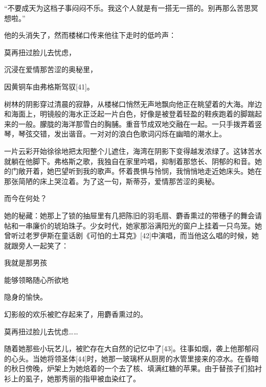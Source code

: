 \documentclass{article}
\begin{document}
“不要成天为这档子事闷闷不乐。我这个人就是有一搭无一搭的。别再那么苦思冥想啦。”



他的头消失了，然而楼梯口传来他往下走时的低吟声：



莫再扭过脸儿去忧虑，



沉浸在爱情那苦涩的奥秘里，



因黄铜车由弗格斯驾驭[41]。



树林的阴影穿过清晨的寂静，从楼梯口悄然无声地飘向他正在眺望着的大海。岸边和海面上，明镜般的海水正泛起一片白色，好像是被登着轻盈的鞋疾跑着的脚踹起来的一般。朦胧的海洋那雪白的胸脯。重音节成双地交融在一起。一只手拨弄着竖琴，琴弦交错，发出谐音。一对对的浪白色歌词闪烁在幽暗的潮水上。



一片云彩开始徐徐地把太阳整个儿遮住，海湾在阴影下变得越发浓绿了。这钵苦水就躺在他脚下。弗格斯之歌，我独自在家里吟唱，抑制着那悠长、阴郁的和音。她的门敞开着，她巴望听到我的歌声。怀着畏惧与怜悯，我悄悄地走近她床头。她在那张简陋的床上哭泣着。为了这一句，斯蒂芬，爱情那苦涩的奥秘。



而今在何处？



她的秘藏：她那上了锁的抽屉里有几把陈旧的羽毛扇、麝香熏过的带穗子的舞会请帖和一串廉价的琥珀珠子。少女时代，她家那浴满阳光的窗户上挂着一只鸟笼。她曾听过老罗伊斯在童话剧《可怕的土耳克》[42]中演唱，而当他这么唱的时候，她就跟旁人一起笑了：



我就是那男孩



能够领略随心所欲地



隐身的愉快。



幻影般的欢乐被贮存起来了，用麝香熏过的。



莫再扭过脸儿去忧虑……



随着她那些小玩艺儿，被贮存在大自然的记忆中了[43]。往事如烟，袭上他那郁闷的心头。当她将领圣体[44]时，她那一玻璃杯从厨房的水管里接来的凉水。在昏暗的秋日傍晚，炉架上为她焙着的一个去了核、填满红糖的苹果。由于替孩子们掐衬衫上的虱子，她那秀丽的指甲被血染红了。
\end{document}
